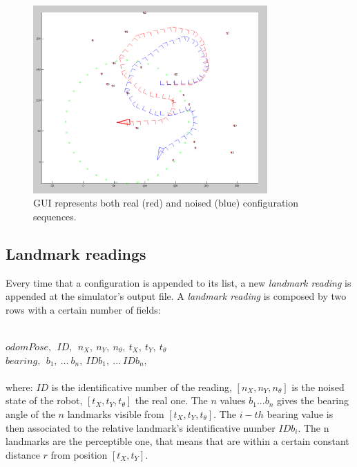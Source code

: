\begin{figure}[htbp]
  \centering
    \includegraphics[width=0.8\textwidth]{images/matlab_simulator.png}
  \caption{GUI represents both real (red) and noised (blue) configuration sequences.}
  \label{fig:matlab_simulator}
\end{figure}

\vspace{1 cm}
\subsection{Landmark readings}
Every time that a configuration is appended to its list, a new \textit{landmark reading} is appended at the simulator's output file.
A \textit{landmark reading} is composed by two rows with a certain number of fields:\\\

$
odomPose, ~~ ID, ~~ n_X, ~ n_Y, ~  n_{\theta}, ~  t_X, ~  t_Y, ~ t_{\theta}
$\\

$
bearing, ~~ b_1, ~ ... ~ b_n, ~ IDb_1, ~ ... ~ IDb_n, 
$\\ \\
where:
\textit{$ID$} is the identificative number of the reading, $[n_X, n_Y, n_{\theta}]$ is the noised state of the robot, $[t_X, t_Y, t_{\theta}]$ the real one.
The $n$ values $ b_1 ... b_n$ gives the bearing angle of the $n$ landmarks visible from $[t_X, t_Y, t_{\theta}]$. The $i-th$ bearing value is then associated to 
the relative landmark's identificative number $IDb_i$.
The n landmarks are the perceptible one, that means that are within a certain constant distance $r$ from position $[t_X, t_Y ]$.


